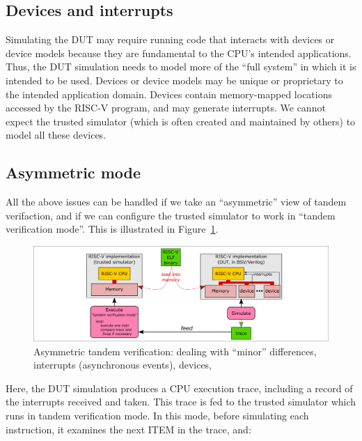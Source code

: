 
\subsection{Devices and interrupts}

Simulating the DUT may require running code that interacts with
devices or device models because they are fundamental to the CPU's
intended applications.  Thus, the DUT simulation needs to model more
of the ``full system'' in which it is intended to be used.  Devices or
device models may be unique or proprietary to the intended application
domain.  Devices contain memory-mapped locations accessed by the
RISC-V program, and may generate interrupts.  We cannot expect the
trusted simulator (which is often created and maintained by others) to
model all these devices.


\subsection{Asymmetric mode}

All the above issues can be handled if we take an ``asymmetric'' view
of tandem verifaction, and if we can configure the trusted simulator
to work in ``tandem verification mode''.  This is illustrated in
Figure~\ref{Fig_tandem_verification_II}.
\begin{figure}[htbp]
  \centerline{\includegraphics[width=6in,angle=0]{Figures/Fig_tandem_verification_II}}
  \caption{\label{Fig_tandem_verification_II}
           Asymmetric tandem verification: dealing with ``minor'' differences,
           interrupts (asynchronous events), devices, {\etc}}
\end{figure}

Here, the DUT simulation produces a CPU execution trace, including a
record of the interrupts received and taken.  This trace is fed to the
trusted simulator which runs in tandem verification mode.  In this
mode, before simulating each instruction, it examines the next ITEM in
the trace, and:

